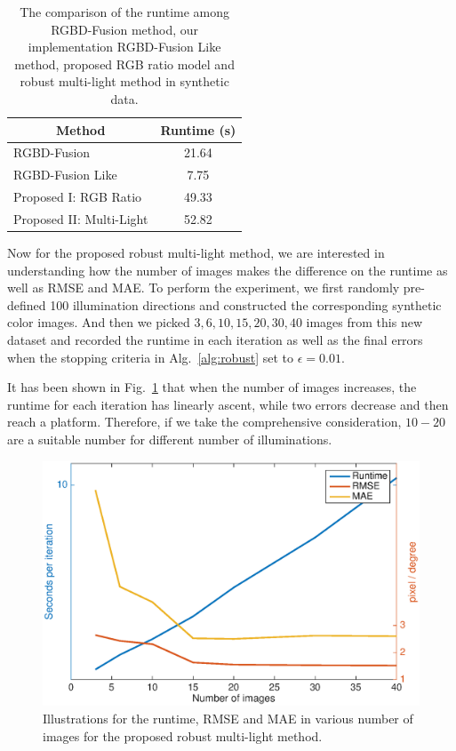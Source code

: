 \begin{table}[!ht]
\caption{The comparison of the runtime among RGBD-Fusion method, our implementation RGBD-Fusion Like method,  proposed RGB ratio model and robust multi-light method in synthetic data.}
\label{tab:runtime}
\centering
\begin{tabular}{|m{4cm} |m{7cm}|}
\hline
\multicolumn{1}{|c|}{Method}                               & \multicolumn{1}{c|}{Runtime (s)}                                                                                                                 \\ \hline
RGBD-Fusion~\cite{or2015rgbd} & \multicolumn{1}{c|}{21.64}             \\ \hline
RGBD-Fusion Like                     & \multicolumn{1}{c|}{7.75}      \\ \hline
Proposed I: RGB Ratio                            & \multicolumn{1}{c|}{49.33}        \\ \hline
Proposed II: Multi-Light                        & \multicolumn{1}{c|}{52.82}\\ \hline
\end{tabular}
\end{table}

Now for the proposed robust multi-light method, we are interested in understanding how the number of  images makes the difference on the runtime as well as RMSE and MAE.
To perform the experiment, we first randomly pre-defined 100 illumination directions and constructed the corresponding synthetic color images.
And then we picked $3,6,10,15,20,30, 40$ images from this new dataset and recorded the runtime in each iteration as well as the final errors when the stopping criteria in Alg.~\ref{alg:robust} set to $\epsilon = 0.01$.

It has been shown in Fig.~\ref{fig:result_runtime} that when the number of images increases, the runtime for each iteration has linearly ascent, while two errors decrease and then reach a platform.
Therefore, if we take the comprehensive consideration, $10-20$ are a suitable number for different number of illuminations.

\begin{figure}[!ht]
    \centering
    \includegraphics[height = 0.6\linewidth]{figures/result/runtime.eps} 
    \caption{Illustrations for the runtime, RMSE and MAE in various number of images for the proposed robust multi-light method.}
\label{fig:result_runtime}
\end{figure}



